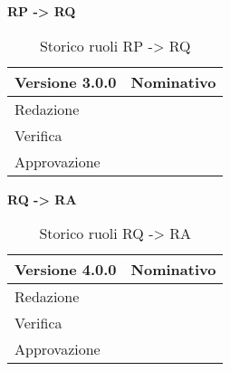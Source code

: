 \textbf{RP -> RQ}
\label{tabVers3}
\begin{table}[h]
	\begin{tabular}{p{} p{}}
		\toprule \textbf{Versione 3.0.0}	&	\textbf{Nominativo}\\
		\midrule Redazione	& \PM\\
		\midrule Verifica &	\TP\\
		\midrule Approvazione	&	\FM\\
		\bottomrule
	\end{tabular}
	\caption{Storico ruoli RP -> RQ}
\end{table}

\textbf{RQ -> RA}
\label{tabVers3}
\begin{table}[h]
	\begin{tabular}{p{} p{}}
		\toprule \textbf{Versione 4.0.0}	&	\textbf{Nominativo}\\
		\midrule Redazione	& \PM\\
		\midrule Verifica &	\TP\\
		\midrule Approvazione	&	\FM\\
		\bottomrule
	\end{tabular}
	\caption{Storico ruoli RQ -> RA}
\end{table}
